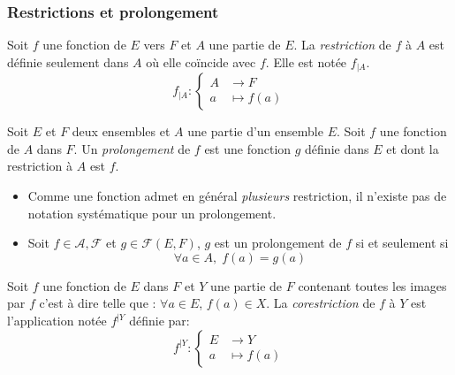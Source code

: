 \subsubsection{Restrictions et prolongement}
\begin{defi}
Soit $f$ une fonction de $E$ vers $F$ et $A$ une partie de $E$. La \emph{restriction} de $f$ à $A$ est définie seulement dans $A$ où elle coïncide avec $f$. Elle est notée $f_{|A}$.
\begin{displaymath}
 f_{|A}:
\left\lbrace 
\begin{aligned}
 A &\rightarrow F \\ a &\mapsto f(a)
\end{aligned}
\right.  
\end{displaymath}
\end{defi}

\begin{defi}
 Soit $E$ et $F$ deux ensembles et $A$ une partie d'un ensemble $E$. Soit $f$ une fonction de $A$ dans $F$. Un \emph{prolongement} de $f$ est une fonction $g$ définie dans $E$ et dont la restriction à $A$ est $f$.  
\end{defi}
\begin{rems}
 \begin{itemize}
  \item Comme une fonction admet en général \emph{plusieurs} restriction, il n'existe pas de notation systématique pour un prolongement.
  \item Soit $f\in \mathcal{A,F}$ et $g\in \mathcal{F}(E,F)$, $g$ est un prolongement de $f$ si et seulement si 
\begin{displaymath}
 \forall a\in A, \; f(a) = g(a)
\end{displaymath}
 \end{itemize}
\end{rems}

\begin{defi}
 Soit $f$ une fonction de $E$ dans $F$ et $Y$ une partie de $F$ contenant toutes les images par $f$ c'est à dire telle que : $\forall a\in E$, $f(a)\in X$. La \emph{corestriction} de $f$ à $Y$ est l'application notée $f^{|Y}$ définie par:
\begin{displaymath}
 f^{|Y}:
\left\lbrace 
\begin{aligned}
 E &\rightarrow Y \\ a &\mapsto f(a)
\end{aligned}
\right.  
\end{displaymath} 
\end{defi}

